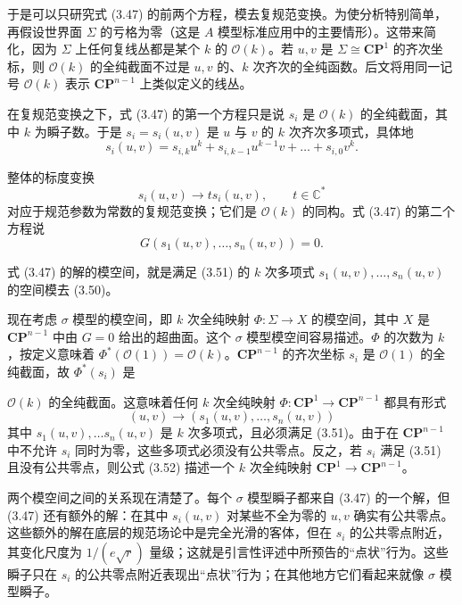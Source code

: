 \label{op:42}
于是可以只研究式 (3.47) 的前两个方程，模去复规范变换。为使分析特别简单，再假设世界面 $\Sigma$ 的亏格为零（这是 $A$ 模型标准应用中的主要情形）。这带来简化，因为 $\Sigma$ 上任何复线丛都是某个 $k$ 的 $\mathcal{O}(k)$。若 $u,v$ 是 $\Sigma\cong\mathbf{CP}^1$ 的齐次坐标，则 $\mathcal{O}(k)$ 的全纯截面不过是 $u,v$ 的、$k$ 次齐次的全纯函数。后文将用同一记号 $\mathcal{O}(k)$ 表示 $\mathbf{CP}^{n-1}$ 上类似定义的线丛。

在复规范变换之下，式 (3.47) 的第一个方程只是说 $s_i$ 是 $\mathcal{O}(k)$ 的全纯截面，其中 $k$ 为瞬子数。于是 $s_i=s_i(u,v)$ 是 $u$ 与 $v$ 的 $k$ 次齐次多项式，具体地
\begin{equation}
s_i(u,v)=s_{i,k}u^k+s_{i,k-1}u^{k-1}v+\ldots+s_{i,0}v^k.
\tag{3.49}
\end{equation}

整体的标度变换
\begin{equation}
s_i(u,v)\to t s_i(u,v),\qquad t\in\mathbb{C}^*
\tag{3.50}
\end{equation}
对应于规范参数为常数的复规范变换；它们是 $\mathcal{O}(k)$ 的同构。式 (3.47) 的第二个方程说
\begin{equation}
G(s_1(u,v),\ldots,s_n(u,v))=0.
\tag{3.51}
\end{equation}

式 (3.47) 的解的模空间，就是满足 (3.51) 的 $k$ 次多项式 $s_1(u,v),\ldots,s_n(u,v)$ 的空间模去 (3.50)。

现在考虑 $\sigma$ 模型的模空间，即 $k$ 次全纯映射 $\Phi:\Sigma\to X$ 的模空间，其中 $X$ 是 $\mathbf{CP}^{n-1}$ 中由 $G=0$ 给出的超曲面。这个 $\sigma$ 模型模空间容易描述。$\Phi$ 的次数为 $k$，按定义意味着 $\Phi^*(\mathcal{O}(1))=\mathcal{O}(k)$。$\mathbf{CP}^{n-1}$ 的齐次坐标 $s_i$ 是 $\mathcal{O}(1)$ 的全纯截面，故 $\Phi^*(s_i)$ 是

\label{op:43}
$\mathcal{O}(k)$ 的全纯截面。这意味着任何 $k$ 次全纯映射 $\Phi:\mathbf{CP}^1\to\mathbf{CP}^{n-1}$ 都具有形式
\begin{equation}
(u,v)\to(s_1(u,v),\ldots,s_n(u,v))
\tag{3.52}
\end{equation}
其中 $s_1(u,v),\ldots s_n(u,v)$ 是 $k$ 次多项式，且必须满足 (3.51)。由于在 $\mathbf{CP}^{n-1}$ 中不允许 $s_i$ 同时为零，这些多项式必须没有公共零点。反之，若 $s_i$ 满足 (3.51) 且没有公共零点，则公式 (3.52) 描述一个 $k$ 次全纯映射 $\mathbf{CP}^1\to\mathbf{CP}^{n-1}$。

两个模空间之间的关系现在清楚了。每个 $\sigma$ 模型瞬子都来自 (3.47) 的一个解，但 (3.47) 还有额外的解：在其中 $s_i(u,v)$ 对某些不全为零的 $u,v$ 确实有公共零点。这些额外的解在底层的规范场论中是完全光滑的客体，但在 $s_i$ 的公共零点附近，其变化尺度为 $1/(e\sqrt r)$ 量级；这就是引言性评述中所预告的“点状”行为。这些瞬子只在 $s_i$ 的公共零点附近表现出“点状”行为；在其他地方它们看起来就像 $\sigma$ 模型瞬子。

